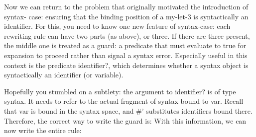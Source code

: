 
Now we can return to the problem that originally motivated the introduction of
syntax- case: ensuring that the binding position of a my-let-3 is syntactically
an identifier. For this, you need to know one new feature of syntax-case: each
rewriting rule can have two parts (as above), or three. If there are three
present, the middle one is treated as a guard: a predicate that must evaluate to
true for expansion to proceed rather than signal a syntax error. Especially
useful in this context is the predicate identifier?, which determines whether a
syntax object is syntactically an identifier (or variable).


Hopefully you stumbled on a subtlety: the argument to identifier? is of type
syntax. It needs to refer to the actual fragment of syntax bound to var. Recall
that var is bound in the syntax space, and \#' substitutes identifiers bound
there. Therefore, the correct way to write the guard is:
With this information, we can now write the entire rule:

